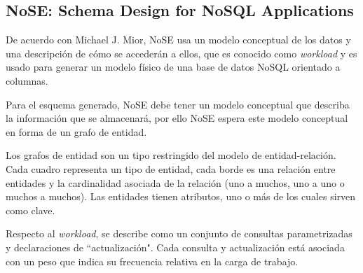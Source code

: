 \subsection{NoSE: Schema Design for NoSQL Applications}
De acuerdo con Michael J. Mior\cite{mior_nose_2017}, NoSE usa un modelo conceptual de los datos y una descripción de cómo se accederán a ellos, que es conocido como \textit{workload} y es usado para generar un modelo físico de una base de datos NoSQL orientado a columnas.


Para el esquema generado, NoSE debe tener un modelo conceptual que describa la información que se almacenará, por ello NoSE espera este modelo conceptual en forma de un grafo de entidad.


Los grafos de entidad son un tipo restringido del modelo de entidad-relación. Cada cuadro representa un tipo de entidad, cada borde es una relación entre entidades y la cardinalidad asociada de la relación (uno a muchos, uno a uno o muchos a muchos). Las entidades tienen atributos, uno o más de los cuales sirven como clave. 


Respecto al \textit{workload}, se describe como un conjunto de consultas parametrizadas y declaraciones de ``actualización". Cada consulta y actualización está asociada con un peso que indica su frecuencia relativa en la carga de trabajo.